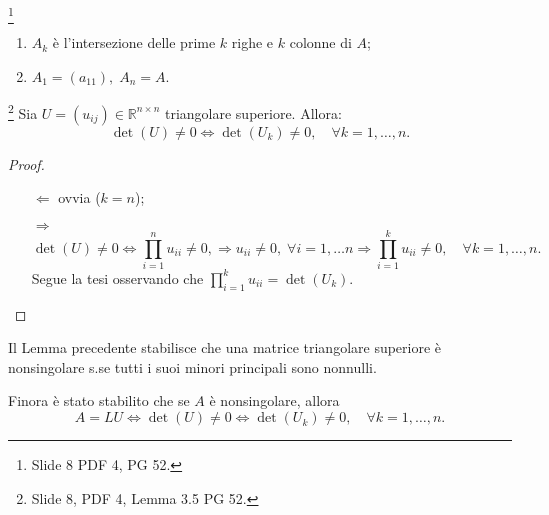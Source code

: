 \begin{remark}
    \footnote{Slide 8 PDF 4, PG 52.}
    \begin{enumerate}
        \item $A_k$ è l'intersezione delle prime $k$ righe e $k$ colonne di $A$;
        \item $A_1=(a_{11}),\; A_n=A.$
    \end{enumerate}
\end{remark}

\begin{lemma}
    \footnote{Slide 8, PDF 4, Lemma 3.5 PG 52.}
    Sia $U=(u_{ij})\in\mathbb R^{n\times n}$ triangolare superiore. Allora:
    \begin{equation*}
        \det(U)\neq 0\iff \det(U_k)\neq 0,\quad \forall k=1,\hdots, n.
    \end{equation*}
\end{lemma}
\begin{proof}
    \begin{itemize}
        \item [$\Leftarrow$] ovvia ($k=n$);
        \item [$\Rightarrow$]
        \begin{equation*}
             \det(U)\neq 0 \iff \prod_{i=1}^nu_{ii}\neq 0,\Rightarrow u_{ii}\neq 0,\; \forall i=1,\hdots n \Rightarrow \prod_{i=1}^k u_{ii}\neq 0,\quad \forall k=1,\hdots, n.
        \end{equation*}
        Segue la tesi osservando che $\prod_{i=1}^k u_{ii}=\det(U_k).$
    \end{itemize}
\end{proof}

Il Lemma precedente stabilisce che una matrice triangolare superiore è nonsingolare s.se tutti i suoi minori principali sono nonnulli. 

Finora è stato stabilito che se $A$ è nonsingolare, allora
\begin{equation}\label{eq:det(LU)neq0}
    A=LU \iff \det(U)\neq 0\iff \det(U_k)\neq 0,\quad \forall k=1,\hdots,n.
\end{equation}

